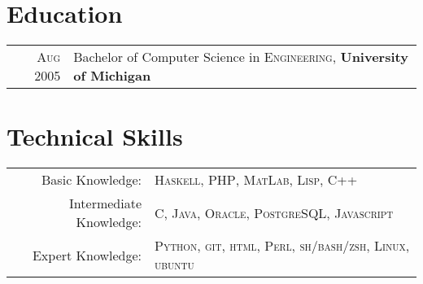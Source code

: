 \documentclass[a4paper,10pt]{article}
\begin{document}
\section{Education}
\begin{tabular}{rl}
\textsc{Aug} 2005 & Bachelor of Computer Science in \textsc{Engineering}, \textbf{University of Michigan}\\
\end{tabular}

\section{Technical Skills}
\begin{tabular}{rl}
Basic Knowledge:        & \textsc{Haskell},
                            \textsc{PHP},
                            \textsc{MatLab},
                            \textsc{Lisp},
                            \textsc{C++} \\
Intermediate Knowledge: & \textsc{C},
                            \textsc{Java},
                            \textsc{Oracle},
                            \textsc{PostgreSQL},
                            \textsc{Javascript} \\
Expert Knowledge: & \textsc{Python},
                        \textsc{git},
                        \textsc{html},
                        \textsc{Perl},
                        \textsc{sh/bash/zsh},
                        \textsc{Linux},
                        \textsc{ubuntu} \\


\end{tabular}

\end{document}
